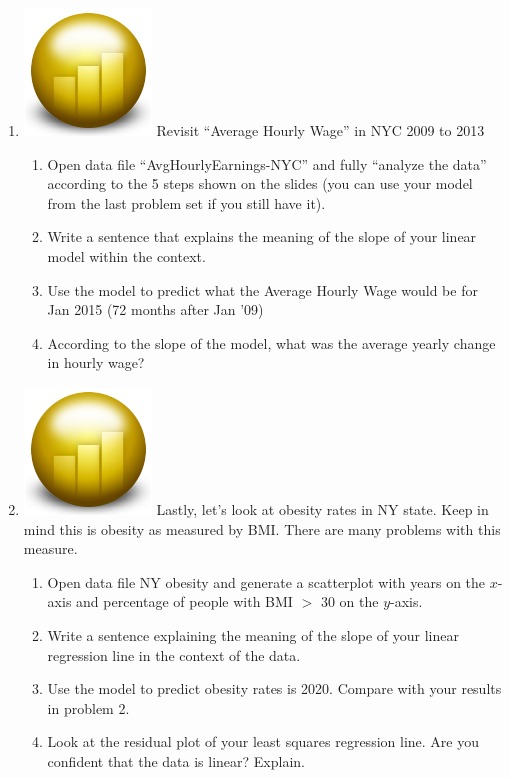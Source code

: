 \documentclass[12pt]{article}
\theoremstyle{plain}     %
\begin{document}
\begin{enumerate}
\begin{enumerate}
		\end{enumerate}
	
	\item \includegraphics[scale=.1]{fathom.png} Revisit “Average Hourly Wage” in NYC 2009 to 2013 
		\begin{enumerate}
			\item Open data file “AvgHourlyEarnings-NYC” and fully “analyze the data” according to the 5 steps shown on the slides (you can use your model from the last problem set if you still have it).
			\item Write a sentence that explains the meaning of the slope of your linear model within the context.
			\item Use the model to predict what the Average Hourly Wage would be for Jan 2015 (72 months after Jan ’09) 
			\item According to the slope of the model, what was the average yearly change in hourly wage?
		\end{enumerate}
	
	\item \includegraphics[scale=.1]{fathom.png} Lastly, let's look at obesity rates in NY state. Keep in mind this is obesity as measured by BMI. There are many problems with this measure.
		\begin{enumerate}
			\item Open data file NY obesity and generate a scatterplot with years on the $x$-axis and percentage of people with BMI $>$ 30 on the $y$-axis.
			\item Write a sentence explaining the meaning of the slope of your linear regression line in the context of the data.
			\item Use the model to predict obesity rates is 2020. Compare with your results in problem 2.
			\item Look at the residual plot of your least squares regression line. Are you confident that the data is linear? Explain.
		\end{enumerate}
	
	
\end{enumerate}
	
\end{document}

